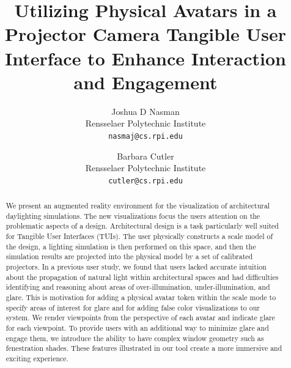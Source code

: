 \documentclass[10pt,twocolumn,letterpaper]{article}
\begin{document}
\title{Utilizing Physical Avatars in a Projector Camera Tangible User Interface to Enhance Interaction and Engagement}

\author{Joshua D Nasman\\
Rensselaer Polytechnic Institute\\
{\tt\small nasmaj@cs.rpi.edu}\\
\and
Barbara Cutler\\
Rensselaer Polytechnic Institute\\
{\tt\small cutler@cs.rpi.edu}\\
}


\maketitle

\begin{abstract}
%
We present an augmented reality environment for the visualization of
architectural daylighting simulations.  The new visualizations focus
the users attention on the problematic aspects of a design.
Architectural design is a task particularly well suited for Tangible
User Interfaces (TUIs).  
The user 
physically constructs a scale model of the design,
a lighting simulation is then performed on this space, and then the
simulation results are projected into the physical model by a set of
calibrated projectors.
In a previous user study, we found that users lacked accurate
intuition about the propagation of natural light within architectural
spaces and had difficulties identifying and reasoning about areas of
over-illumination, under-illumination, and glare.  
This is motivation for adding a physical avatar token within the scale mode
to specify areas of interest for glare and for adding false color
visualizations to our system.  We render viewpoints from the
perspective of each avatar and indicate glare for each viewpoint.
To provide users with an additional way to minimize glare and 
engage them, we introduce the ability to have complex window geometry
such as fenestration shades.  These features illustrated in
our tool create a more immersive and exciting experience.
\end{abstract}
\end{document}
